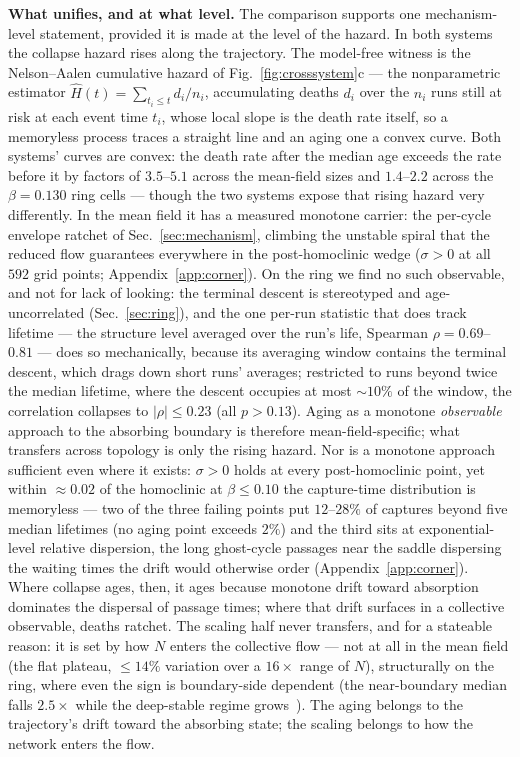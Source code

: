 \documentclass[pdflatex,sn-mathphys,Numbered]{sn-jnl}
\begin{document}
\textbf{What unifies, and at what level.} The comparison supports one
mechanism-level statement, provided it is made at the level of the hazard. In
both systems the collapse hazard rises along the trajectory. The model-free
witness is the Nelson--Aalen cumulative hazard of Fig.~\ref{fig:crosssystem}c
--- the nonparametric estimator $\hat H(t) = \sum_{t_i \le t} d_i / n_i$,
accumulating deaths $d_i$ over the $n_i$ runs still at risk at each event time
$t_i$, whose local slope is the death rate itself, so a memoryless process
traces a straight line and an aging one a convex curve. Both systems' curves
are convex: the death rate after the median age exceeds the rate before it by
factors of $3.5$--$5.1$ across the mean-field sizes and $1.4$--$2.2$ across the
$\beta = 0.130$ ring cells --- though the two
systems expose that rising hazard very differently. In the mean field it has
a measured monotone carrier: the per-cycle envelope ratchet of
Sec.~\ref{sec:mechanism}, climbing the unstable spiral that the reduced flow
guarantees everywhere in the post-homoclinic wedge ($\sigma > 0$ at all $592$
grid points; Appendix~\ref{app:corner}). On the ring we find no such
observable, and not for lack of looking: the terminal descent is stereotyped
and age-uncorrelated (Sec.~\ref{sec:ring}), and the one per-run statistic
that does track lifetime --- the structure level averaged over the run's
life, Spearman $\rho = 0.69$--$0.81$ --- does so mechanically, because its
averaging window contains the terminal descent, which drags down short runs'
averages; restricted to runs beyond twice the median lifetime, where the
descent occupies at most ${\sim}10\%$ of the window, the correlation collapses
to $|\rho| \le 0.23$ (all $p > 0.13$). Aging as a monotone
\emph{observable} approach to the absorbing boundary is therefore
mean-field-specific; what transfers across topology is only the rising
hazard. Nor is a monotone approach sufficient even where it exists:
$\sigma > 0$ holds at every post-homoclinic point, yet within ${\approx}0.02$
of the homoclinic at $\beta \le 0.10$ the capture-time distribution is
memoryless --- two of the three failing points put $12$--$28\%$ of captures
beyond five median lifetimes (no aging point exceeds $2\%$) and the third
sits at exponential-level relative dispersion, the long ghost-cycle passages
near the saddle dispersing the waiting times the drift would otherwise order
(Appendix~\ref{app:corner}). Where collapse ages, then, it
ages because monotone drift toward absorption dominates the dispersal of
passage times; where that drift surfaces in a collective observable, deaths
ratchet. The scaling half never transfers, and for a stateable reason: it is
set by how $N$ enters the collective flow --- not at all in the mean field
(the flat plateau, ${\le}14\%$ variation over a $16\times$ range of $N$),
structurally on the ring, where even the sign is boundary-side dependent
(the near-boundary median falls $2.5\times$ while the deep-stable regime
grows~\cite{wo2011}). The aging belongs to the trajectory's drift toward the
absorbing state; the scaling belongs to how the network enters the flow.
\end{document}

